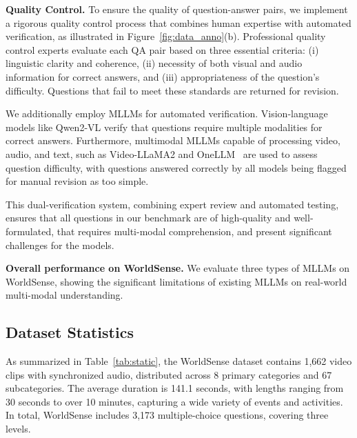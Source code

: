 \textbf{Quality Control.} 
To ensure the quality of question-answer pairs, we implement a rigorous quality control process that combines human expertise with automated verification, as illustrated in Figure~\ref{fig:data_anno}(b). Professional quality control experts evaluate each QA pair based on three essential criteria: (i) linguistic clarity and coherence, (ii) necessity of both visual and audio information for correct answers, and (iii) appropriateness of the question's difficulty. Questions that fail to meet these standards are returned for revision.

We additionally employ MLLMs for automated verification. Vision-language models like Qwen2-VL\cite{wang2024qwen2} verify that questions require multiple modalities for correct answers. Furthermore, multimodal MLLMs capable of processing video, audio, and text, such as Video-LLaMA2\cite{cheng2024videollama} and OneLLM~\cite{han2024onellm} are used to assess question difficulty, with questions answered correctly by all models being flagged for manual revision as too simple.

This dual-verification system, combining expert review and automated testing, ensures that all questions in our benchmark are of high-quality and well-formulated, that requires multi-modal comprehension, and present significant challenges for the models. 

\begin{table*}[htbp]
  \caption{\textbf{Overall performance on WorldSense.} 
  We evaluate three types of MLLMs on WorldSense, 
  showing the significant limitations of existing MLLMs on real-world multi-modal understanding.}
  \label{tab:main_performance}
  \centering
  \begin{adjustbox}{width=\textwidth}
    
  \end{adjustbox}
  \vspace{-6mm}
\end{table*}




\subsection{Dataset Statistics}

As summarized in Table~\ref{tab:static}, the WorldSense dataset contains 1,662 video clips with synchronized audio, distributed across 8 primary categories and 67 subcategories. 
The average duration is 141.1 seconds, with lengths ranging from 30 seconds to over 10 minutes, capturing a wide variety of events and activities. In total, WorldSense includes 3,173 multiple-choice questions, covering three levels.

